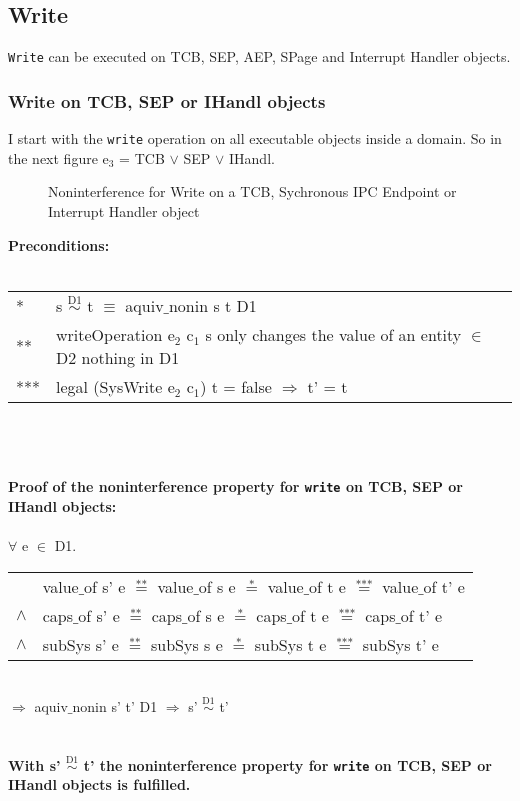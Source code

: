 \subsection{Write}\label{Write}
\texttt{Write} can be executed on TCB, SEP, AEP, SPage and Interrupt Handler objects.
\subsubsection{Write on TCB, SEP or IHandl objects}
I start with the \texttt{write} operation on all executable objects inside a domain. So in the next figure e$_3$ = TCB $\vee$ SEP $\vee$ IHandl.
\begin{flushleft}
\begin{figure}[H]
\caption{Noninterference for Write on a TCB, Sychronous IPC Endpoint or Interrupt Handler object}
\end{figure}
\end{flushleft}
\textbf{Preconditions:} \\ \\
\begin{tabular}{ll}
* & s $\overset{\text{D1}}{\sim}$ t $\equiv$ aquiv$\_$nonin s t D1	\\ 
** & writeOperation e$_2$ c$_1$ s only changes the value of an entity $\in$ D2 nothing in D1 \\ 
*** & legal (SysWrite e$_2$ c$_1$) t = false $\Rightarrow$ t' = t
\end{tabular} \\ \\ \\
\textbf{Proof of the noninterference property for \texttt{write} on TCB, SEP or IHandl objects:}\\ \\
$\forall$ e $\in$ D1. \\ 
\begin{tabular}{ll}
& value$\_$of s' e $\overset{\text{**}}{=}$ value$\_$of s e $\overset{\text{*}}{=}$ value$\_$of t e $\overset{\text{***}}{=}$ value$\_$of t' e \\
$\wedge$ & caps$\_$of s' e $\overset{\text{**}}{=}$ caps$\_$of s e $\overset{\text{*}}{=}$ caps$\_$of t e $\overset{\text{***}}{=}$ caps$\_$of t' e \\
$\wedge$ & subSys s' e $\overset{\text{**}}{=}$ subSys s e $\overset{\text{*}}{=}$ subSys t e $\overset{\text{***}}{=}$ subSys t' e
\end{tabular} \\
$\Rightarrow$ aquiv$\_$nonin s' t' D1 $\Rightarrow$ s' $\overset{\text{D1}}{\sim}$ t' \\ \\ \\
\textbf{With s' $\overset{\text{D1}}{\sim}$ t' the noninterference property for \texttt{write} on TCB, SEP or IHandl objects is fulfilled.} 
\clearpage
